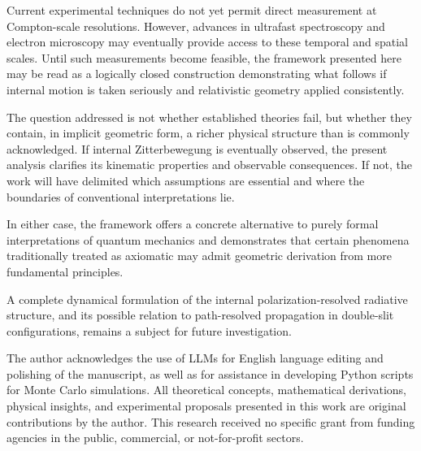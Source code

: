 \documentclass[%
 reprint,
 amsmath,amssymb,
 aps,
 prb,
]{revtex4-2}
\numberwithin{equation}{section}
\begin{document}
Current experimental techniques do not yet permit direct measurement at Compton-scale resolutions. However, advances in ultrafast spectroscopy and electron microscopy may eventually provide access to these temporal and spatial scales. Until such measurements become feasible, the framework presented here may be read as a logically closed construction demonstrating what follows if internal motion is taken seriously and relativistic geometry applied consistently.

The question addressed is not whether established theories fail, but whether they contain, in implicit geometric form, a richer physical structure than is commonly acknowledged. If internal Zitterbewegung is eventually observed, the present analysis clarifies its kinematic properties and observable consequences. If not, the work will have delimited which assumptions are essential and where the boundaries of conventional interpretations lie.

In either case, the framework offers a concrete alternative to purely formal interpretations of quantum mechanics and demonstrates that certain phenomena traditionally treated as axiomatic may admit geometric derivation from more fundamental principles.

A complete dynamical formulation of the internal polarization-resolved radiative structure, and its possible relation to path-resolved propagation in double-slit configurations, remains a subject for future investigation.


\begin{acknowledgments}
The author acknowledges the use of LLMs for English language editing and polishing of the manuscript, as well as for assistance in developing Python scripts for Monte Carlo simulations. All theoretical concepts, mathematical derivations, physical insights, and experimental proposals presented in this work are original contributions by the author. This research received no specific grant from funding agencies in the public, commercial, or not-for-profit sectors.
\end{acknowledgments}
\end{document}
